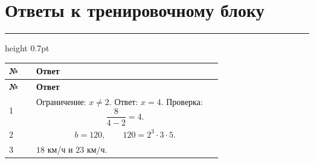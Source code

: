 \documentclass[a4paper,12pt]{article}
\newcommand{\sectionline}{%
  \par\vspace{0.1em}%
  {\color{accent}\hrule height 0.7pt}%
  \vspace{0.55em}}
\begin{document}
\clearpage

\section*{Ответы к тренировочному блоку}
\sectionline

\begin{longtable}{@{}p{0.12\linewidth}p{0.82\linewidth}@{}}

\toprule
\textbf{№} & \textbf{Ответ} \\
\midrule
\endfirsthead

\toprule
\textbf{№} & \textbf{Ответ} \\
\midrule
\endhead

1
&
Ограничение:
$x\ne2$.
Ответ:
$x=4$.
Проверка:
\[
\frac{8}{4-2}=4.
\]
\\

2
&
\[
b=120,
\qquad
120=2^3\cdot3\cdot5.
\]
\\

3
&
$18$ км/ч и $23$ км/ч.
\\

\bottomrule

\end{longtable}

\clearpage
\end{document}
